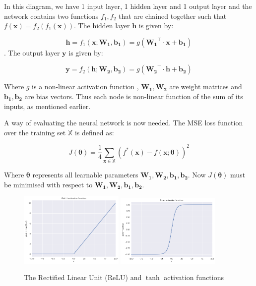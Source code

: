 In this diagram, we have 1 input layer, 1 hidden layer and 1 output layer and the network contains two functions $f_1, f_2$ that are chained together such that $f(\bm{x}) = f_2(f_1(\bm{x}))$.
The hidden layer $\bm{h}$ is given by:

\begin{equation}
    \bm{h} = f_1(\bm{x}; \bm{W_1}, \bm{b_1}) = g(\bm{W_1}^\top \cdot \bm{x} + \bm{b_1})
    \label{eq:hidden_layer}
\end{equation}
.
The output layer $\bm{y}$ is given by:

\begin{equation}
    \bm{y} = f_2(\bm{h}; \bm{W_2}, \bm{b_2}) = g(\bm{W_2}^\top \cdot \bm{h} + \bm{b_2})
    \label{eq:output_layer}
\end{equation}

Where $g$ is a non-linear activation function , $\bm{W_1}, \bm{W_2}$ are weight matrices and $\bm{b_1}, \bm{b_2}$ are bias vectors.
Thus each node is non-linear function of the sum of its inputs, as mentioned earlier.

A way of evaluating the neural network is now needed.
The MSE loss function over the training set $\mathbb{X}$ is defined as:

\begin{equation}
    J(\bm{\theta}) = \frac{1}{4} \sum_{\bm{x} \in \mathbb{X}} (f^*(\bm{x}) - f(\bm{x}; \bm{\theta}))^2
    \label{mse_loss_function}
\end{equation}

Where $\bm{\theta}$ represents all learnable parameters $\bm{W_1}, \bm{W_2}, \bm{b_1}, \bm{b_2}$.
Now $J(\bm{\theta})$ must be minimised with respect to $\bm{W_1}, \bm{W_2}, \bm{b_1}, \bm{b_2}$.

\begin{figure}[hbtp!]
    \centering
    \includegraphics[width=0.45\textwidth]{./img/ReLU.png}
    \includegraphics[width=0.45\textwidth]{./img/tanh.png}
    \caption{The Rectified Linear Unit (ReLU) and $\tanh$ activation functions}
    \label{fig:ReLU_tanh}
\end{figure}



